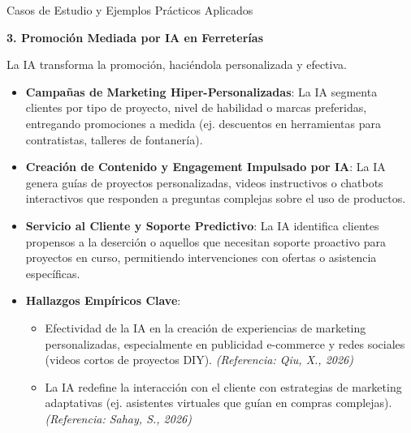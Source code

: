 \documentclass[aspectratio=169]{beamer}
\begin{document}
\begin{frame}{Casos de Estudio y Ejemplos Prácticos Aplicados}


\textbf{3. Promoción Mediada por IA en Ferreterías}

La IA transforma la promoción, haciéndola personalizada y efectiva.

\begin{itemize}
  \item \textbf{Campañas de Marketing Hiper-Personalizadas}: La IA segmenta clientes por tipo de proyecto, nivel de habilidad o marcas preferidas, entregando promociones a medida (ej. descuentos en herramientas para contratistas, talleres de fontanería).
  \item \textbf{Creación de Contenido y Engagement Impulsado por IA}: La IA genera guías de proyectos personalizadas, videos instructivos o chatbots interactivos que responden a preguntas complejas sobre el uso de productos.
  \item \textbf{Servicio al Cliente y Soporte Predictivo}: La IA identifica clientes propensos a la deserción o aquellos que necesitan soporte proactivo para proyectos en curso, permitiendo intervenciones con ofertas o asistencia específicas.
  \item \textbf{Hallazgos Empíricos Clave}:
  \begin{itemize}
    \item Efectividad de la IA en la creación de experiencias de marketing personalizadas, especialmente en publicidad e-commerce y redes sociales (videos cortos de proyectos DIY). \textit{(Referencia: Qiu, X., 2026)}
    \item La IA redefine la interacción con el cliente con estrategias de marketing adaptativas (ej. asistentes virtuales que guían en compras complejas). \textit{(Referencia: Sahay, S., 2026)}
  \end{itemize}
\end{itemize}
\end{frame}
\end{document}
